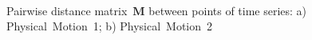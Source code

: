 \documentclass[12pt, twoside]{article}
\numberwithin{equation}{section}
\begin{document}
\begin{figure}[h!t]\center
{}
\\
\caption{Pairwise distance matrix~$\textbf{M}$ between points of time series:  a) Physical~Motion~1; b) Physical~Motion~2}
\label{fig_real_distance}
\end{figure}
\end{document}
